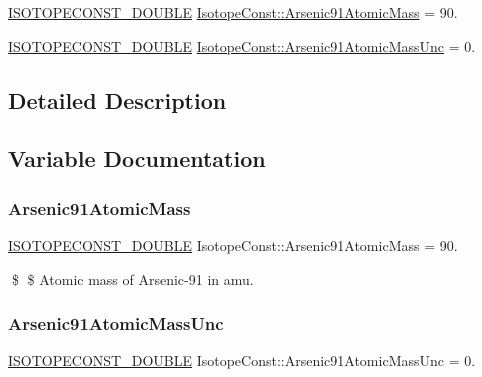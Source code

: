 \begin{DoxyCompactItemize}
\item 
\mbox{\hyperlink{group___isotope_const-_macros_ga8f45a7272ce02c0b4c65c44636ed719a}{I\+S\+O\+T\+O\+P\+E\+C\+O\+N\+S\+T\+\_\+\+D\+O\+U\+B\+LE}} \mbox{\hyperlink{group___isotope_const-_arsenic-_as91_ga6a4dd95b2524b32926c247d6a8ecd86c}{Isotope\+Const\+::\+Arsenic91\+Atomic\+Mass}} = 90.
\item 
\mbox{\hyperlink{group___isotope_const-_macros_ga8f45a7272ce02c0b4c65c44636ed719a}{I\+S\+O\+T\+O\+P\+E\+C\+O\+N\+S\+T\+\_\+\+D\+O\+U\+B\+LE}} \mbox{\hyperlink{group___isotope_const-_arsenic-_as91_gacf2643fc4351be453d3d725543c7bc69}{Isotope\+Const\+::\+Arsenic91\+Atomic\+Mass\+Unc}} = 0.
\end{DoxyCompactItemize}


\subsection{Detailed Description}


\subsection{Variable Documentation}
\mbox{\label{group___isotope_const-_arsenic-_as91_ga6a4dd95b2524b32926c247d6a8ecd86c}} 
\subsubsection{\texorpdfstring{Arsenic91\+Atomic\+Mass}{Arsenic91AtomicMass}}
{\footnotesize\ttfamily \mbox{\hyperlink{group___isotope_const-_macros_ga8f45a7272ce02c0b4c65c44636ed719a}{I\+S\+O\+T\+O\+P\+E\+C\+O\+N\+S\+T\+\_\+\+D\+O\+U\+B\+LE}} Isotope\+Const\+::\+Arsenic91\+Atomic\+Mass = 90.}

\$ \$ Atomic mass of Arsenic-\/91 in amu. \mbox{\label{group___isotope_const-_arsenic-_as91_gacf2643fc4351be453d3d725543c7bc69}} 
\subsubsection{\texorpdfstring{Arsenic91\+Atomic\+Mass\+Unc}{Arsenic91AtomicMassUnc}}
{\footnotesize\ttfamily \mbox{\hyperlink{group___isotope_const-_macros_ga8f45a7272ce02c0b4c65c44636ed719a}{I\+S\+O\+T\+O\+P\+E\+C\+O\+N\+S\+T\+\_\+\+D\+O\+U\+B\+LE}} Isotope\+Const\+::\+Arsenic91\+Atomic\+Mass\+Unc = 0.}

